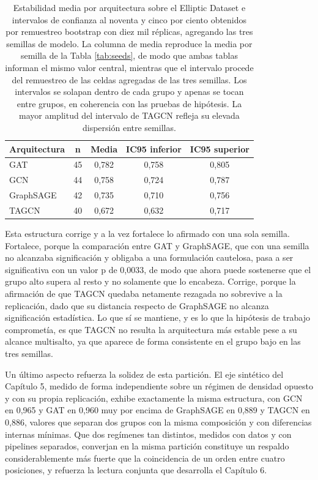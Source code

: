 \begin{table}[htbp]
    \centering
    \renewcommand{\arraystretch}{1.3}
    \begin{tabular}{lcccc}
    \toprule
    \textbf{Arquitectura} & \textbf{n} & \textbf{Media} & \textbf{IC95 inferior} & \textbf{IC95 superior} \\
    \midrule
    GAT       & 45 & 0,782 & 0,758 & 0,805 \\
    GCN       & 44 & 0,758 & 0,724 & 0,787 \\
    GraphSAGE & 42 & 0,735 & 0,710 & 0,756 \\
    TAGCN     & 40 & 0,672 & 0,632 & 0,717 \\
    \bottomrule
    \end{tabular}
    \caption{Estabilidad media por arquitectura sobre el Elliptic Dataset e intervalos de confianza al noventa y cinco por ciento obtenidos por remuestreo bootstrap con diez mil réplicas, agregando las tres semillas de modelo. La columna de media reproduce la media por semilla de la Tabla \ref{tab:seeds}, de modo que ambas tablas informan el mismo valor central, mientras que el intervalo procede del remuestreo de las celdas agregadas de las tres semillas. Los intervalos se solapan dentro de cada grupo y apenas se tocan entre grupos, en coherencia con las pruebas de hipótesis. La mayor amplitud del intervalo de TAGCN refleja su elevada dispersión entre semillas.}
    \label{tab:ic}
\end{table}

Esta estructura corrige y a la vez fortalece lo afirmado con una sola semilla. Fortalece, porque la comparación entre GAT y GraphSAGE, que con una semilla no alcanzaba significación y obligaba a una formulación cautelosa, pasa a ser significativa con un valor p de 0,0033, de modo que ahora puede sostenerse que el grupo alto supera al resto y no solamente que lo encabeza. Corrige, porque la afirmación de que TAGCN quedaba netamente rezagada no sobrevive a la replicación, dado que su distancia respecto de GraphSAGE no alcanza significación estadística. Lo que sí se mantiene, y es lo que la hipótesis de trabajo comprometía, es que TAGCN no resulta la arquitectura más estable pese a su alcance multisalto, ya que aparece de forma consistente en el grupo bajo en las tres semillas.

Un último aspecto refuerza la solidez de esta partición. El eje sintético del Capítulo 5, medido de forma independiente sobre un régimen de densidad opuesto y con su propia replicación, exhibe exactamente la misma estructura, con GCN en 0,965 y GAT en 0,960 muy por encima de GraphSAGE en 0,889 y TAGCN en 0,886, valores que separan dos grupos con la misma composición y con diferencias internas mínimas. Que dos regímenes tan distintos, medidos con datos y con pipelines separados, converjan en la misma partición constituye un respaldo considerablemente más fuerte que la coincidencia de un orden entre cuatro posiciones, y refuerza la lectura conjunta que desarrolla el Capítulo 6.

